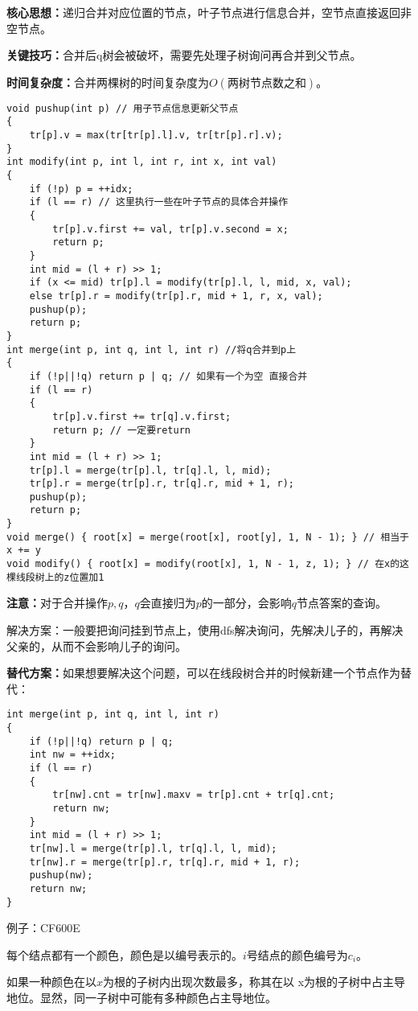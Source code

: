 \documentclass[a4paper, fontset=none]{ctexart}
\begin{document}
\textbf{核心思想：}递归合并对应位置的节点，叶子节点进行信息合并，空节点直接返回非空节点。

\textbf{关键技巧：}合并后q树会被破坏，需要先处理子树询问再合并到父节点。

\textbf{时间复杂度：}合并两棵树的时间复杂度为$O(\text{两树节点数之和})$。
\begin{verbatim}
void pushup(int p) // 用子节点信息更新父节点
{
    tr[p].v = max(tr[tr[p].l].v, tr[tr[p].r].v);
}
int modify(int p, int l, int r, int x, int val)
{
    if (!p) p = ++idx;
    if (l == r) // 这里执行一些在叶子节点的具体合并操作
    {
        tr[p].v.first += val, tr[p].v.second = x;
        return p;
    }
    int mid = (l + r) >> 1;
    if (x <= mid) tr[p].l = modify(tr[p].l, l, mid, x, val);
    else tr[p].r = modify(tr[p].r, mid + 1, r, x, val);
    pushup(p);
    return p;
}
int merge(int p, int q, int l, int r) //将q合并到p上
{
    if (!p||!q) return p | q; // 如果有一个为空 直接合并
    if (l == r)
    {
        tr[p].v.first += tr[q].v.first;
        return p; // 一定要return
    }
    int mid = (l + r) >> 1;
    tr[p].l = merge(tr[p].l, tr[q].l, l, mid);
    tr[p].r = merge(tr[p].r, tr[q].r, mid + 1, r);
    pushup(p);
    return p;
}
void merge() { root[x] = merge(root[x], root[y], 1, N - 1); } // 相当于x += y
void modify() { root[x] = modify(root[x], 1, N - 1, z, 1); } // 在x的这棵线段树上的z位置加1
\end{verbatim}
\textbf{注意：}对于合并操作$p, q$，$q$会直接归为$p$的一部分，会影响$q$节点答案的查询。

解决方案：一般要把询问挂到节点上，使用dfs解决询问，先解决儿子的，再解决父亲的，从而不会影响儿子的询问。

\textbf{替代方案：}如果想要解决这个问题，可以在线段树合并的时候新建一个节点作为替代：
\begin{verbatim}
int merge(int p, int q, int l, int r)
{
    if (!p||!q) return p | q;
    int nw = ++idx;
    if (l == r)
    {
        tr[nw].cnt = tr[nw].maxv = tr[p].cnt + tr[q].cnt;
        return nw;
    }
    int mid = (l + r) >> 1;
    tr[nw].l = merge(tr[p].l, tr[q].l, l, mid);
    tr[nw].r = merge(tr[p].r, tr[q].r, mid + 1, r);
    pushup(nw);
    return nw;
}
\end{verbatim}

例子：CF600E

每个结点都有一个颜色，颜色是以编号表示的。$i$号结点的颜色编号为$c_i$。

如果一种颜色在以$x$为根的子树内出现次数最多，称其在以 x为根的子树中占主导地位。显然，同一子树中可能有多种颜色占主导地位。
\end{document}
